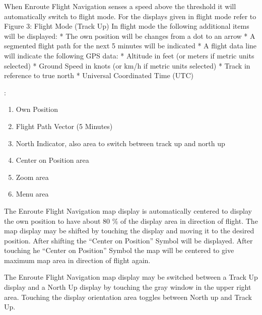 \documentclass[letterpaper,10pt,english]{sphinxmanual}
\begin{document}

When Enroute Flight Navigation senses a speed above the threshold it will automatically switch to flight mode.
For the displays given in flight mode refer to Figure 3: Flight Mode (Track Up)
In flight mode the following additional items will be displayed:
* The own position will be changes from a dot to an arrow
* A segmented flight path for the next 5 minutes will be indicated
* A flight data line will indicate the following GPS data:
* Altitude in feet (or meters if metric units selected)
* Ground Speed in knots (or km/h if metric units selected)
* Track in reference to true north
* Universal Coordinated Time (UTC)

\begin{figure}[htbp]
\centering

\noindent{}
\end{figure}

:
\begin{enumerate}
%
\item {} 
Own Position

\item {} 
Flight Path Vector (5 Minutes)

\item {} 
North Indicator, also area to switch between track up and north up

\item {} 
Center on Position area

\item {} 
Zoom area

\item {} 
Menu area

\end{enumerate}

The  Enroute Flight Navigation map display is automatically centered to display the own position to have about 80 \% of the display area in direction  of flight.
The map display may be shifted by touching the display and moving it to the desired position. After shifting the  “Center on Position”  Symbol will be displayed. After touching he  “Center on Position”  Symbol the map will be centered to give maximum map area in direction of flight again.


The Enroute Flight Navigation map display may be switched between a Track Up display and a North Up display by touching the gray window in the upper right area.
Touching the display orientation area toggles between North up and Track Up.
\end{document}

